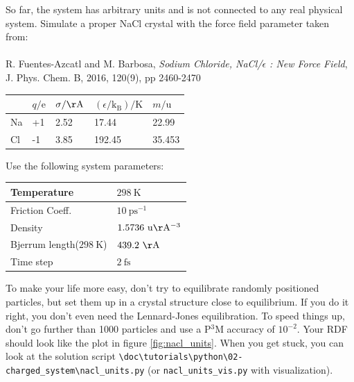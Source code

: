 \documentclass[
a4paper,                        %
11pt,                           %
twoside,                        %
footsepline,                    %
headsepline,                    %
headexclude,                    %
footexclude,                    %
pagesize,                       %
]{scrartcl}
\begin{document}
So far, the system has arbitrary units and is not connected to any real physical system.
Simulate a proper NaCl crystal with the force field parameter taken from:\\
\\
\noindent R. Fuentes-Azcatl and M. Barbosa, \emph{Sodium Chloride, NaCl/$\epsilon$ : New Force Field},\\ J. Phys. Chem. B, 2016, 120(9), pp 2460-2470
\begin{table}[h]
    \centering
    \begin{tabular}{l|llll}
           & $q/\mathrm{e}$  & $\sigma / \mathrm{\AA} $ & $(\epsilon /\mathrm{k_B})/\mathrm{K}$ & $m/\mathrm{u}$  \\
        \hline
        Na & +1     & 2.52          & 17.44                 & 22.99  \\
        \hline
        Cl & -1     & 3.85          & 192.45                & 35.453 
    \end{tabular}
\end{table}

Use the following system parameters:

\begin{table}[h]
    \centering
    \begin{tabular}{l|l}
        Temperature            & $298 \ \mathrm{K}$          \\
        \hline
        Friction Coeff.        & $10 \ \mathrm{ps^{-1}}$      \\
        \hline
        Density                & $1.5736 \ \mathrm{u \AA^{-3}}$ \\
        \hline
        Bjerrum length($298 \ \mathrm{K}$) & $439.2 \ \mathrm{\AA}$      \\
        \hline
        Time step              & $2 \ \mathrm{fs}$
    \end{tabular}
\end{table}

To make your life more easy, don't try to equilibrate randomly positioned particles,
but set them up in a crystal structure close to equilibrium. If you do it right,
you don't even need the Lennard-Jones equilibration. 
To speed things up, don't go further than 1000 particles and use a P$^3$M accuracy of $10^{-2}$.
Your RDF should look like the plot in figure \ref{fig:nacl_units}. When you get stuck,
you can look at the solution script \verb|\doc\tutorials\python\02-charged_system\nacl_units.py| 
(or \verb|nacl_units_vis.py| with visualization).
\end{document}
